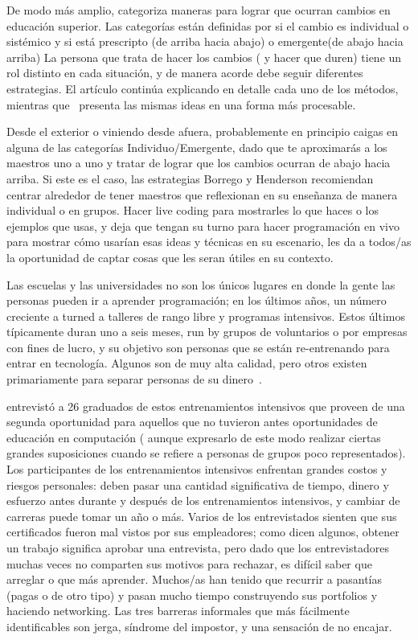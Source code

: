 De modo más amplio,
\cite{Borr2014} categoriza maneras para lograr que ocurran cambios en educación superior.
Las categorías están definidas por si el cambio es individual o sistémico y si está prescripto (de arriba hacia abajo) o emergente(de abajo hacia arriba)
La persona que trata de hacer los cambios ( y hacer que duren)
tiene un rol distinto en cada situación,
y de manera acorde debe seguir diferentes estrategias.
El artículo continúa explicando en detalle cada uno de los métodos,
mientras que~\cite{Hend2015a,Hend2015b} presenta las mismas ideas en una forma más 
procesable.


Desde el exterior o viniendo desde afuera,
probablemente en principio caigas en alguna de las categorías  Individuo/Emergente,
dado que te aproximarás a los maestros uno a uno
y tratar de lograr que los cambios ocurran de abajo hacia arriba.
Si este es el caso,
las estrategias Borrego y Henderson recomiendan centrar alrededor
de tener maestros que reflexionan en su enseñanza de manera individual o en grupos.
Hacer live coding para mostrarles lo que haces o los ejemplos que usas,
y deja que tengan su turno para hacer programación en vivo
para mostrar cómo usarían esas ideas y técnicas en su escenario,
les da a todos/as la oportunidad de  captar cosas que les seran útiles en su contexto.



Las escuelas y las universidades no son los únicos lugares en donde la gente las personas pueden ir a aprender programación;
en los últimos años, un número creciente a turned a talleres de rango libre y programas intensivos.
Estos últimos típicamente duran uno a seis meses,
run by grupos de voluntarios o por empresas con fines de lucro,
y su objetivo son personas que se están re-entrenando para entrar en tecnología.
Algunos son de muy alta calidad,
pero otros existen primariamente para separar personas de su dinero~\cite{McMi2017}.


\cite{Thay2017} entrevistó a 26 graduados de estos entrenamientos intensivos
que proveen de una segunda oportunidad para aquellos que no tuvieron antes oportunidades de educación en computación
( aunque expresarlo de este modo realizar ciertas grandes suposiciones 
cuando se refiere a personas de grupos poco representados).
Los participantes de los entrenamientos intensivos enfrentan grandes costos y riesgos personales:
deben pasar una cantidad significativa de tiempo, dinero y esfuerzo antes durante y después de los entrenamientos intensivos, y cambiar de carreras puede tomar un año o más.
Varios de los entrevistados sienten que sus certificados fueron mal vistos por sus empleadores;
como dicen algunos,
obtener un trabajo significa aprobar una entrevista,
pero dado que los entrevistadores muchas veces no comparten sus motivos para rechazar,
es difícil saber que arreglar o que más aprender.
Muchos/as han tenido que recurrir a pasantías (pagas o de otro tipo)
y pasan mucho tiempo construyendo sus portfolios y haciendo networking.
Las tres barreras informales que más fácilmente identificables son jerga,
síndrome del impostor, y una sensación de no encajar.



